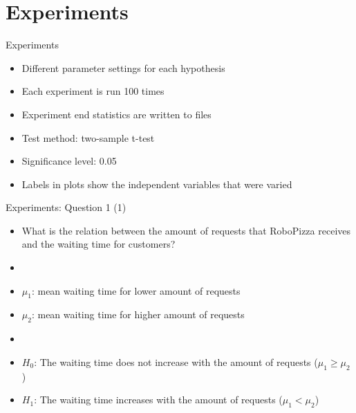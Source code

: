 \section{Experiments}

\begin{frame}{Experiments}
    \begin{itemize}
        \item Different parameter settings for each hypothesis
        \item Each experiment is run 100 times
        \item Experiment end statistics are written to files
        \item Test method: two-sample t-test %
        \item Significance level: 0.05
        \item Labels in plots show the independent variables that were varied
    \end{itemize}
\end{frame}


\begin{frame}{Experiments: Question 1 (1)}
    \begin{itemize}
        \item What is the relation between the amount of requests that RoboPizza receives and the waiting time for customers?
        \item[]
        \item $\mu_1$: mean waiting time for lower amount of requests
        \item $\mu_2$: mean waiting time for higher amount of requests
        \item[]
        \item $H_0$: The waiting time does not increase with the amount of requests ($\mu_1 \geq \mu_2$)
        \item $H_1$: The waiting time increases with the amount of requests ($\mu_1 < \mu_2$)
    \end{itemize}
\end{frame}

